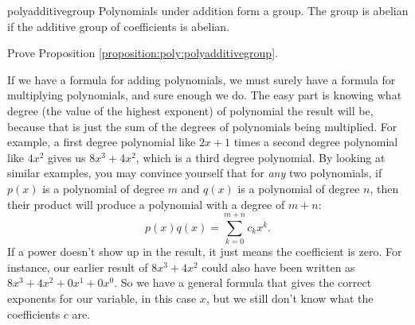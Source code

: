 \begin {prop}{polyadditivegroup} Polynomials under addition form a group. The group is abelian if the additive group of coefficients is abelian.
\end{prop}

\begin{exercise}{}
Prove Proposition \ref{proposition:poly:polyadditivegroup}.
\end{exercise}

If we have a formula for adding polynomials, we must surely have a formula for multiplying polynomials, and sure enough we do.  The easy part is knowing what degree (the value of the highest exponent) of polynomial the result will be, because that is just the sum of the degrees of polynomials being multiplied. For example, a first degree polynomial like $2x+1$ times a second degree polynomial like $4x^2$ gives us $8x^3+4x^2$, which is a third degree polynomial.  By looking at similar examples, you may convince yourself that for \emph{any} two polynomials, if $p(x)$ is a polynomial of degree $m$ and $q(x)$ is a polynomial of degree $n$, then their product will produce a polynomial with a degree of $m+n$:
\[
p(x) q(x) = \sum_{k=0}^{m+n} c_k x^k.
\]
If a power doesn't show up in the result, it just means the coefficient is zero.  For instance, our earlier result of $8x^3+4x^2$ could also have been written as $8x^3+4x^2 + 0x^1 + 0x^0$.  So we have a general formula that gives the correct exponents for our variable, in this case $x$, but we still don't know what the coefficients $c$ are.
 

